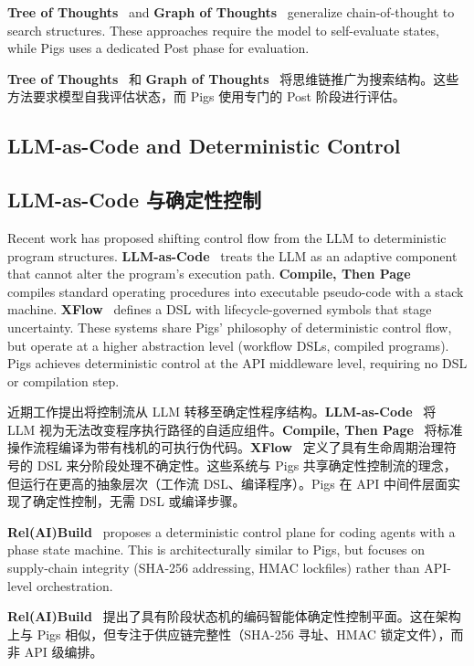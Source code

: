 \textbf{Tree of Thoughts}~\citep{yao2023tot} and \textbf{Graph of Thoughts}~\citep{besta2023got} generalize chain-of-thought to search structures. These approaches require the model to self-evaluate states, while Pigs uses a dedicated Post phase for evaluation.
\begin{chinese}
\textbf{Tree of Thoughts}~\citep{yao2023tot} 和 \textbf{Graph of Thoughts}~\citep{besta2023got} 将思维链推广为搜索结构。这些方法要求模型自我评估状态，而 Pigs 使用专门的 Post 阶段进行评估。
\end{chinese}

\subsection{LLM-as-Code and Deterministic Control}
\begin{chinese}
\subsection{LLM-as-Code 与确定性控制}
\end{chinese}

Recent work has proposed shifting control flow from the LLM to deterministic program structures. \textbf{LLM-as-Code}~\citep{llmascode2026} treats the LLM as an adaptive component that cannot alter the program's execution path. \textbf{Compile, Then Page}~\citep{compilepage2026} compiles standard operating procedures into executable pseudo-code with a stack machine. \textbf{XFlow}~\citep{xflow2026} defines a DSL with lifecycle-governed symbols that stage uncertainty. These systems share Pigs' philosophy of deterministic control flow, but operate at a higher abstraction level (workflow DSLs, compiled programs). Pigs achieves deterministic control at the API middleware level, requiring no DSL or compilation step.
\begin{chinese}
近期工作提出将控制流从 LLM 转移至确定性程序结构。\textbf{LLM-as-Code}~\citep{llmascode2026} 将 LLM 视为无法改变程序执行路径的自适应组件。\textbf{Compile, Then Page}~\citep{compilepage2026} 将标准操作流程编译为带有栈机的可执行伪代码。\textbf{XFlow}~\citep{xflow2026} 定义了具有生命周期治理符号的 DSL 来分阶段处理不确定性。这些系统与 Pigs 共享确定性控制流的理念，但运行在更高的抽象层次（工作流 DSL、编译程序）。Pigs 在 API 中间件层面实现了确定性控制，无需 DSL 或编译步骤。
\end{chinese}

\textbf{Rel(AI)Build}~\citep{relaibuild2026} proposes a deterministic control plane for coding agents with a phase state machine. This is architecturally similar to Pigs, but focuses on supply-chain integrity (SHA-256 addressing, HMAC lockfiles) rather than API-level orchestration.
\begin{chinese}
\textbf{Rel(AI)Build}~\citep{relaibuild2026} 提出了具有阶段状态机的编码智能体确定性控制平面。这在架构上与 Pigs 相似，但专注于供应链完整性（SHA-256 寻址、HMAC 锁定文件），而非 API 级编排。
\end{chinese}

